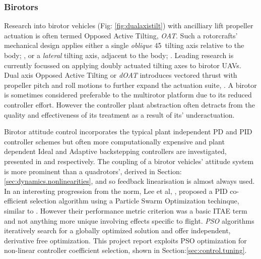 \subsubsection*{Birotors}
Research into birotor vehicles (Fig: \ref{fig:dualaxistilt}) with ancilliary lift propeller actuation is often termed Opposed Active Tilting, \emph{OAT}. Such a rotorcrafts' mechanical design applies either a single \emph{oblique} 45\textdegree ~tilting axis relative to the body; \cite{smalltwotilting,obliquepitch,passiveobliquetilting}, or a \emph{lateral} tilting axis, adjacent to the body; \cite{tiltrotorUAV,adaptivebackstep,tiltrotorcontrol,tpheonix}. Leading research is currently focussed on applying doubly actuated tilting axes to birotor UAVs. Dual axis Opposed Active Tilting or \emph{dOAT} introduces vectored thrust with propeller pitch and roll motions to further expand the actuation suite, \cite{gres2007,opposedlateraldualaxis}. A birotor is sometimes considered preferable to the multirotor platform due to its reduced controller effort. However the controller plant abstraction often detracts from the quality and effectiveness of its treatment as a result of its' underactuation. 
\par
Birotor attitude control incorporates the typical plant independent PD \cite{obliquepitch} and PID \cite{tiltrotorUAV} controller schemes but often more computationally expensive and plant dependent Ideal and Adaptive backstepping controllers are investigated, presented in \cite{smalltwotilting,tpheonix} and \cite{adaptivebackstep} respectively. The coupling of a birotor vehicles' attitude system is more prominent than a quadrotors', derived in Section: \ref{sec:dynamics.nonlinearities}, and so feedback linearisation is almost always used. In an interesting progression from the norm, Lee et al,  \cite{autopilotPSO}, proposed a PID co-efficient selection algorithm using a Particle Swarm Optimization techinque, similar to \cite{adaptivepso}. However their performance metric criterion was a basic ITAE term and not anything more unique involving effects specific to flight. \emph{PSO} algorithms iteratively search for a globally optimized solution and offer independent, derivative free optimization. This project report exploits PSO optimization for non-linear controller coefficient selection, shown in Section:\ref{sec:control.tuning}.
\par

